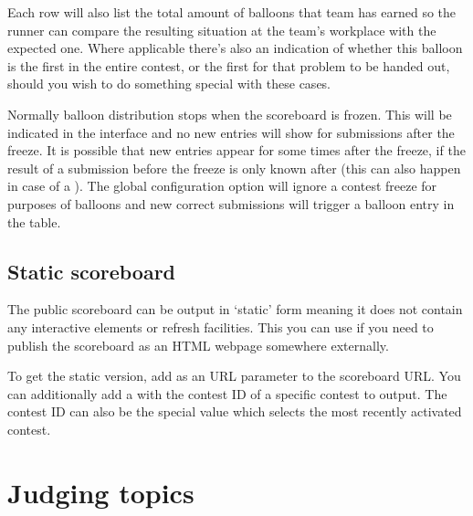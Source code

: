 \documentclass[a4paper,10pt,english,openany]{sphinxmanual}
\begin{document}
\sphinxAtStartPar
Each row will also list the total amount of balloons that team has
earned so the runner can compare the resulting situation at the
team’s workplace with the expected one. Where applicable there’s
also an indication of whether this balloon is the first in the entire
contest, or the first for that problem to be handed out, should
you wish to do something special with these cases.

\sphinxAtStartPar
Normally balloon distribution stops when the scoreboard is frozen.
This will be indicated in the interface and no new entries will
show for submissions after the freeze. It is possible that new
entries appear for some times after the freeze, if the result of
a submission before the freeze is only known after (this can also
happen in case of a {\hyperref[\detokenize{judging:rejudging}]{}}).
The global configuration option  will
ignore a contest freeze for purposes of balloons and new correct
submissions will trigger a balloon entry in the table.


\subsection{Static scoreboard}
\label{\detokenize{running:static-scoreboard}}
\sphinxAtStartPar
The public scoreboard can be output in ‘static’ form meaning it does
not contain any interactive elements or refresh facilities. This you
can use if you need to publish the scoreboard as an HTML webpage
somewhere externally.

\sphinxAtStartPar
To get the static version, add  as an URL parameter to
the  scoreboard URL. You can additionally add a
 with the contest ID of a specific contest to output.
The contest ID can also be the special value  which selects
the most recently activated contest.

\sphinxstepscope


\section{Judging topics}
\label{\detokenize{judging:judging-topics}}\label{\detokenize{judging::doc}}
\end{document}
